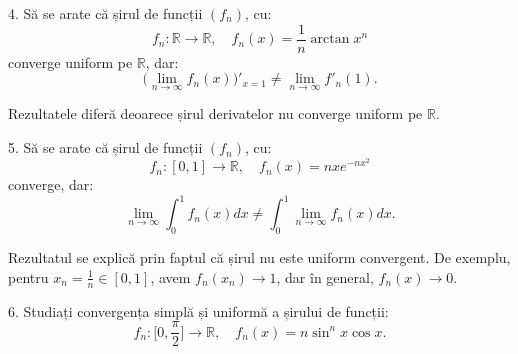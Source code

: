 \documentclass[11pt,a4paper]{article}
\newcommand\RR{\mathbb{R}}
\theoremstyle{dotless}
\theoremstyle{dotlessdr}
\begin{document}
\vspace{1cm}
4. Să se arate că șirul de funcții $(f_n)$, cu:
\[
  f_n : \RR \to \RR, \quad f_n(x) = \frac{1}{n} \arctan x^n
\]
converge uniform pe $\RR$, dar:
\[
  \Big( \lim_{n \to \infty} f_n(x) \Big)'_{x = 1} \neq \lim_{n \to \infty} f'_n(1).
\]

Rezultatele diferă deoarece șirul derivatelor nu converge uniform pe $\RR$.

\vspace{1cm}

5. Să se arate că șirul de funcții $(f_n)$, cu:
\[
  f_n : [0, 1] \to \RR, \quad f_n(x) = nxe^{-nx^2}
\]
converge, dar:
\[
  \lim_{n \to \infty} \int_0^1 f_n(x) dx \neq \int_0^1 \lim_{n \to \infty} f_n(x) dx.
\]

Rezultatul se explică prin faptul că șirul nu este uniform convergent. De exemplu,
pentru $x_n = \frac{1}{n} \in [0, 1]$, avem $f_n(x_n) \to 1$, dar în general,
$f_n(x) \to 0$.

\vspace{1cm}

6. Studiați convergența simplă și uniformă a șirului de funcții:
\[
  f_n : \Big[ 0, \frac{\pi}{2} \Big] \to \RR, \quad %
  f_n(x) = n \sin^n x \cos x.
\]
\end{document}
